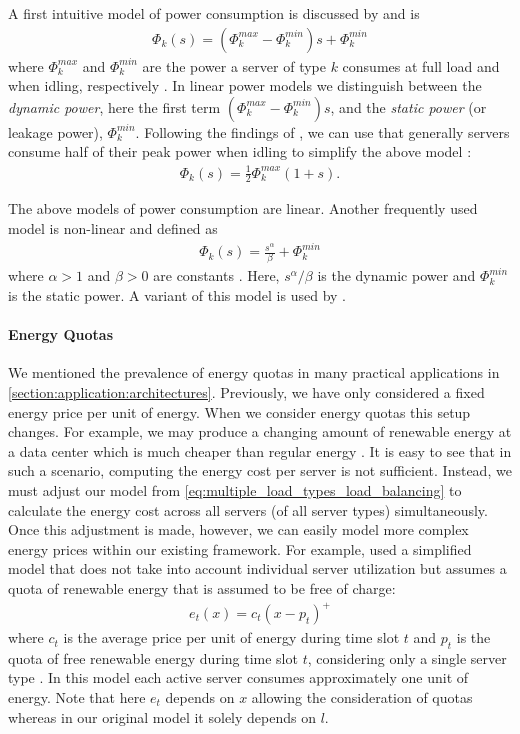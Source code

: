 A first intuitive model of power consumption is discussed by \citeauthor*{Dayarathna2016} and \citeauthor*{Ismail2020} is \begin{align*}
    \Phi_k(s) = (\Phi_k^{max} - \Phi_k^{min})s + \Phi_k^{min}
\end{align*} where $\Phi_k^{max}$ and $\Phi_k^{min}$ are the power a server of type $k$ consumes at full load and when idling, respectively \cite{Dayarathna2016, Ismail2020}. In linear power models we distinguish between the \textit{dynamic power}, here the first term $(\Phi_k^{max} - \Phi_k^{min})s$, and the \textit{static power} (or leakage power), $\Phi_k^{min}$. Following the findings of \citeauthor*{Barroso2007}, we can use that generally servers consume half of their peak power when idling to simplify the above model \cite{Barroso2007, Ismail2020}: \begin{align*}
    \Phi_k(s) = \frac{1}{2} \Phi_k^{max} (1 + s).
\end{align*}

The above models of power consumption are linear. Another frequently used model is non-linear and defined as \begin{align*}
    \Phi_k(s) = \frac{s^{\alpha}}{\beta} + \Phi_k^{min}
\end{align*} where $\alpha > 1$ and $\beta > 0$ are constants \cite{Dayarathna2016}. Here, $s^{\alpha}/\beta$ is the dynamic power and $\Phi_k^{min}$ is the static power. A variant of this model is used by \citeauthor*{Bansal2015} \cite{Bansal2015}.

\paragraph{Energy Quotas} We mentioned the prevalence of energy quotas in many practical applications in \autoref{section:application:architectures}. Previously, we have only considered a fixed energy price per unit of energy. When we consider energy quotas this setup changes. For example, we may produce a changing amount of renewable energy at a data center which is much cheaper than regular energy \cite{Lin2012}. It is easy to see that in such a scenario, computing the energy cost per server is not sufficient. Instead, we must adjust our model from \autoref{eq:multiple_load_types_load_balancing} to calculate the energy cost across all servers (of all server types) simultaneously. Once this adjustment is made, however, we can easily model more complex energy prices within our existing framework. For example, \citeauthor*{Lin2012} used a simplified model that does not take into account individual server utilization but assumes a quota of renewable energy that is assumed to be free of charge: \begin{align*}
    e_t(x) = c_{t}(x - p_t)^+
\end{align*} where $c_t$ is the average price per unit of energy during time slot $t$ and $p_t$ is the quota of free renewable energy during time slot $t$, considering only a single server type \cite{Lin2012}. In this model each active server consumes approximately one unit of energy. Note that here $e_t$ depends on $x$ allowing the consideration of quotas whereas in our original model it solely depends on $l$.

